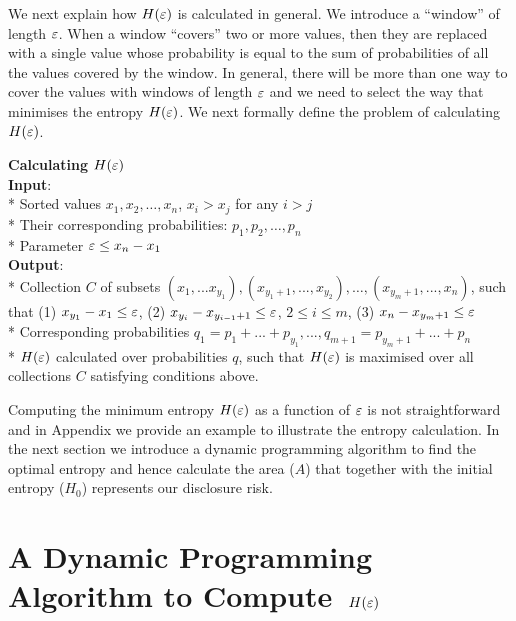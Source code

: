 \documentclass{llncs}
\begin{document}
We next  explain  how $H(\huge{\varepsilon})$
is calculated in general. We introduce a ``window'' of length
$\huge{\varepsilon}$. When a window ``covers'' two or more values,
then they are replaced with a single value whose probability is
equal to the sum of probabilities of all the values covered by the
window. In general, there will be more than one way to cover the values with
windows of length $\huge{\varepsilon}$ and we need to select the way that minimises the entropy $H(\huge{\varepsilon})$.
We next formally define the problem of calculating $H(\huge{\varepsilon})$.

\textbf{Calculating $H(\huge{\varepsilon})$}\\
\textbf{ Input}:\\
* Sorted values  $x_1,x_2,\dots,x_n$, $x_i > x_j$ for any $i > j$\\
* Their corresponding probabilities: $p_1,p_2,\dots,p_n$\\
* Parameter $\huge{\varepsilon} \leq x_n-x_1$  \\
\textbf{Output}:\\
* Collection $C$ of subsets $(x_1,...x_{y_1}), (x_{y_1+1},...,x_{y_2}), \dots, (x_{y_m+1},...,x_n)$,  such that (1) $x_{y_1}-x_1 \leq \huge{\varepsilon}$,  (2) $x_{y_i}-x_{y_{i-1}+1} \leq \huge{\varepsilon}$, $2 \leq i \leq m$, (3) $x_n-x_{y_m+1}  \leq \huge{\varepsilon}$\\
* Corresponding probabilities $q_1=p_1+...+p_{y_1}, ..., q_{m+1}=p_{y_m+1}+...+p_n$\\
* $H(\huge{\varepsilon})$ calculated over probabilities $q$, such that $H(\huge{\varepsilon})$ is maximised over all collections $C$   satisfying conditions above.


Computing the minimum entropy $H(\huge{\varepsilon})$ as a function of
$\huge{\varepsilon}$ is not straightforward and in Appendix
we provide an example to illustrate the entropy calculation.
In the next section we introduce a dynamic programming algorithm to find
the optimal entropy and hence calculate the area ($A$) that
together with the initial entropy ($H_{0}$) represents our
disclosure risk.

\section{A Dynamic Programming Algorithm to Compute~$H(\huge{\varepsilon})$}
\end{document}
